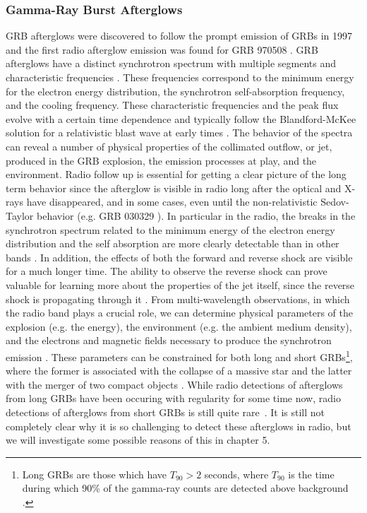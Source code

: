 \documentclass[12pt]{article}
\begin{document}
\subsubsection{Gamma-Ray Burst Afterglows}
GRB afterglows were discovered to follow the prompt emission of GRBs in 1997 and the first radio afterglow emission was found for GRB 970508 \cite{1997Natur.389..261F}. GRB afterglows have a distinct synchrotron spectrum with multiple segments and characteristic frequencies \cite{1999ApJ...523..177W, 1998ApJ...497L..17S}. These frequencies correspond to the minimum energy for the electron energy distribution, the synchrotron self-absorption frequency, and the cooling frequency. These characteristic frequencies and the peak flux evolve with a certain time dependence and typically follow the Blandford-McKee solution for a relativistic blast wave at early times \cite{1976PhFl...19.1130B}. The behavior of the spectra can reveal a number of physical properties of the collimated outflow, or jet, produced in the GRB explosion, the emission processes at play, and the environment. Radio follow up is essential for getting a clear picture of the long term behavior since the afterglow is visible in radio long after the optical and X-rays have disappeared, and in some cases, even until the non-relativistic Sedov-Taylor behavior \cite{1959sadm.book.....S, doi:10.1098/rspa.1950.0050} (e.g. GRB 030329 \cite{2008A&A...480...35V}). In particular in the radio, the breaks in the synchrotron spectrum related to the minimum energy of the electron energy distribution and the self absorption are more clearly detectable than in other bands \cite{2014PASA...31....8G}. In addition, the effects of both the forward and reverse shock are visible for a much longer time. The ability to observe the reverse shock can prove valuable for learning more about the properties of the jet itself, since the reverse shock is propagating through it \cite{2014MNRAS.444.3151V, 2013ApJ...776..119L, 2014ApJ...781...37P}. From multi-wavelength observations, in which the radio band plays a crucial role, we can determine physical parameters of the explosion (e.g. the energy), the environment (e.g. the ambient medium density), and the electrons and magnetic fields necessary to produce the synchrotron emission \cite{2014PASA...31....8G}. These parameters can be constrained for both long and short GRBs\footnote{Long GRBs are those which have $T_{90}>2$ seconds, where $T_{90}$ is the time during which 90\% of the gamma-ray counts are detected above background \cite{1993ApJ...413L.101K}.}, where the former is associated with the collapse of a massive star \cite{1998Natur.395..670G, 2003Natur.423..847H, 1993ApJ...405..273W} and the latter with the merger of two compact objects \cite{1989Natur.340..126E, 1992ApJ...395L..83N, 2017PhRvL.119p1101A}. While radio detections of afterglows from long GRBs have been occuring with regularity for some time now, radio detections of afterglows from short GRBs is still quite rare~\citep{2015ApJ...815..102F}. It is still not completely clear why it is so challenging to detect these afterglows in radio, but we will investigate some possible reasons of this in chapter 5.
\end{document}
